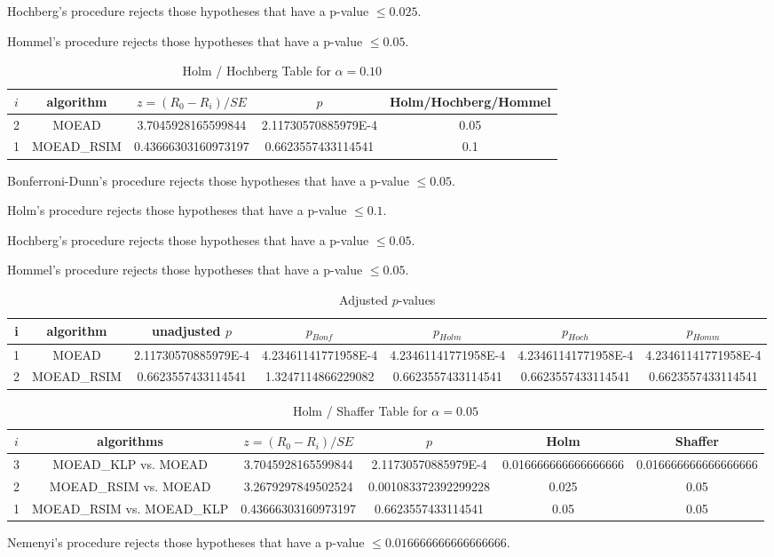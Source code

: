 \documentclass[a4paper,10pt]{article}
\begin{document}
\begin{landscape}
Hochberg's procedure rejects those hypotheses that have a p-value $\le0.025$.


Hommel's procedure rejects those hypotheses that have a p-value $\le0.05$.


\begin{table}[!htp]
\centering\tiny
\caption{Holm / Hochberg Table for $\alpha=0.10$}
\begin{tabular}{ccccc}
$i$&algorithm&$z=(R_0 - R_i)/SE$&$p$&Holm/Hochberg/Hommel\\
\hline
2&MOEAD&3.7045928165599844&2.11730570885979E-4&0.05\\
1&MOEAD_RSIM&0.43666303160973197&0.6623557433114541&0.1\\
\hline
\end{tabular}
\end{table}
Bonferroni-Dunn's procedure rejects those hypotheses that have a p-value $\le0.05$.


Holm's procedure rejects those hypotheses that have a p-value $\le0.1$.


Hochberg's procedure rejects those hypotheses that have a p-value $\le0.05$.


Hommel's procedure rejects those hypotheses that have a p-value $\le0.05$.


\begin{table}[!htp]
\centering\tiny
\caption{Adjusted $p$-values}
\begin{tabular}{ccccccc}
i&algorithm&unadjusted $p$&$p_{Bonf}$&$p_{Holm}$&$p_{Hoch}$&$p_{Homm}$\\
\hline
1&MOEAD&2.11730570885979E-4&4.23461141771958E-4&4.23461141771958E-4&4.23461141771958E-4&4.23461141771958E-4\\
2&MOEAD_RSIM&0.6623557433114541&1.3247114866229082&0.6623557433114541&0.6623557433114541&0.6623557433114541\\
\hline
\end{tabular}
\end{table}

\begin{table}[!htp]
\centering\tiny
\caption{Holm / Shaffer Table for $\alpha=0.05$}
\begin{tabular}{cccccc}
$i$&algorithms&$z=(R_0 - R_i)/SE$&$p$&Holm&Shaffer\\
\hline
3&MOEAD_KLP vs. MOEAD&3.7045928165599844&2.11730570885979E-4&0.016666666666666666&0.016666666666666666\\
2&MOEAD_RSIM vs. MOEAD&3.2679297849502524&0.001083372392299228&0.025&0.05\\
1&MOEAD_RSIM vs. MOEAD_KLP&0.43666303160973197&0.6623557433114541&0.05&0.05\\
\hline
\end{tabular}
\end{table}
Nemenyi's procedure rejects those hypotheses that have a p-value $\le0.016666666666666666$.



\end{landscape}
\end{document}
